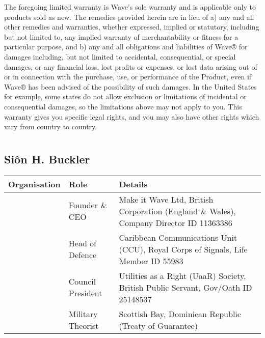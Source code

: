 \documentclass[letterpaper,10pt,english]{sphinxmanual}
\begin{document}
The foregoing limited warranty is Wave’s sole warranty and is applicable only to products sold as new. The remedies provided herein are in lieu of a) any and all other remedies and warranties, whether expressed, implied or statutory, including but not limited to, any implied warranty of merchantability or fitness for a particular purpose, and b) any and all obligations and liabilities of Wave® for damages including, but not limited to accidental, consequential, or special damages, or any financial loss, lost profits or expenses, or lost data arising out of or in connection with the purchase, use, or performance of the Product, even if Wave® has been advised of the possibility of such damages. In the United States for example, some states do not allow exclusion or limitations of incidental or consequential damages, so the limitations above may not apply to you. This warranty gives you specific legal rights, and you may also have other rights which vary from country to country.


\chapter{}
\label{\detokenize{index:document-author-s}}

\section{Siôn H. Buckler}
\label{\detokenize{index:sion-h-buckler}}

\begin{savenotes}\sphinxattablestart
\centering
\begin{tabulary}{\linewidth}[t]{|T|T|T|}
\hline
\sphinxstyletheadfamily 
Organisation
&\sphinxstyletheadfamily 
Role
&\sphinxstyletheadfamily 
Details
\\
\hline
\noindent{}
&
Founder \& CEO
&
Make it Wave Ltd, British Corporation (England \& Wales), Company Director ID 11363386
\\
\hline
\noindent{}
&
Head of Defence
&
Caribbean Communications Unit (CCU), Royal Corps of Signals, Life Member ID 55983
\\
\hline
\noindent{}
&
Council President
&
Utilities as a Right (UaaR) Society, British Public Servant, Gov/Oath ID 25148537
\\
\hline
\noindent{}
&
Military Theorist
&
Scottish Bay, Dominican Republic (Treaty of Guarantee)
\\
\hline
\end{tabulary}
\par
\sphinxattableend\end{savenotes}
\end{document}
